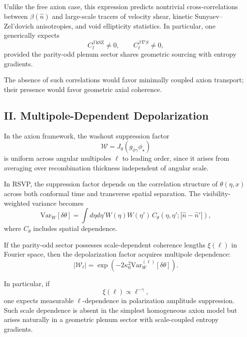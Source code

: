 \documentclass[12pt]{article}
\begin{document}
Unlike the free axion case, this expression predicts nontrivial cross-correlations between $\beta(\hat n)$ and large-scale tracers of velocity shear, kinetic Sunyaev–Zel’dovich anisotropies, and void ellipticity statistics. In particular, one generically expects
\begin{equation}
C_\ell^{\beta\,\mathrm{kSZ}}
\neq 0,
\qquad
C_\ell^{\beta\,\nabla S}
\neq 0,
\end{equation}
provided the parity-odd plenum sector shares geometric sourcing with entropy gradients.

The absence of such correlations would favor minimally coupled axion transport; their presence would favor geometric axial coherence.

\subsection*{II. Multipole-Dependent Depolarization}

In the axion framework, the washout suppression factor
\begin{equation}
\mathcal{W}
=
J_0(g_{\phi\gamma}\phi_\star)
\end{equation}
is uniform across angular multipoles $\ell$ to leading order, since it arises from averaging over recombination thickness independent of angular scale.

In RSVP, the suppression factor depends on the correlation structure of $\theta(\eta,x)$ across both conformal time and transverse spatial separation. The visibility-weighted variance becomes
\begin{equation}
\mathrm{Var}_W[\delta\theta]
=
\int d\eta d\eta'
W(\eta)W(\eta')
\,
C_\theta(\eta,\eta';|\hat n - \hat n'|),
\end{equation}
where $C_\theta$ includes spatial dependence.

If the parity-odd sector possesses scale-dependent coherence lengths $\xi(\ell)$ in Fourier space, then the depolarization factor acquires multipole dependence:
\begin{equation}
|\mathcal{W}_\ell|
=
\exp
\left(
-2\kappa_0^2
\mathrm{Var}_W^{(\ell)}[\delta\theta]
\right).
\end{equation}

In particular, if
\begin{equation}
\xi(\ell)
\propto
\ell^{-\gamma},
\end{equation}
one expects measurable $\ell$-dependence in polarization amplitude suppression. Such scale dependence is absent in the simplest homogeneous axion model but arises naturally in a geometric plenum sector with scale-coupled entropy gradients.
\end{document}
